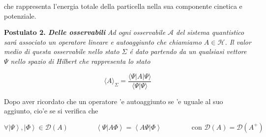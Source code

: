 che rappresenta l'energia totale della particella nella sua componente cinetica e potenziale.


\textbf{Postulato 2. \textit{Delle osservabili}} \textit{Ad ogni osservabile $\mathcal{A}$ del sistema quantistico sar\'a associato un operatore lineare e autoaggiunto che chiamiamo $A \in \mathcal{H}$. Il valor medio di questa osservabile nello stato $\Sigma$ \'e dato partendo da un qualsiasi vettore $\Psi$ nello spazio di Hilbert che rappresenta lo stato}

$$\langle A\rangle_{\Sigma}=\frac{\langle\Psi|A|\Psi\rangle}{\langle\Psi|\Psi\rangle}$$

Dopo aver ricordato che un operatore 'e autoaggiunto se 'e uguale al suo aggiunto, cio'e se si verifica che

$$\forall\left|\Psi\right\rangle,\left|\Phi\right\rangle\in\mathcal{D}(A) \qquad\qquad \left\langle\Psi|A\Phi\right\rangle=\left\langle A\Psi|\Phi\right\rangle \qquad\qquad \text{ con } {\mathcal{D}}(A)={\mathcal{D}}(A^{+})$$

